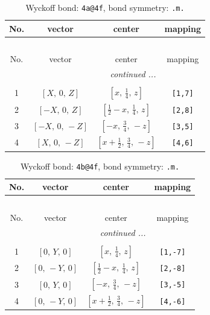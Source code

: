 \documentclass[fleqn,8pt]{jsarticle}
\begin{document}
\begin{longtable}{cccc}
\caption{Wyckoff bond: {\tt 4a@4f}, bond symmetry: {\tt .m.}}
 \\
 \hline \hline
No. & vector & center & mapping \\ \hline \endfirsthead

\multicolumn{3}{l}{\tablename\ \thetable{}} \\
 \hline \hline
No. & vector & center & mapping \\ \hline \endhead

 \hline \hline
\multicolumn{3}{r}{\footnotesize\it continued ...} \\ \endfoot

 \hline \hline
\multicolumn{3}{r}{} \\ \endlastfoot

1 & $\left[ X,\, 0,\, Z \right]$ & $\left[ x,\, \frac{1}{4},\, z \right]$ & {\tt [1,7]} \\ \hline
2 & $\left[ - X,\, 0,\, Z \right]$ & $\left[ \frac{1}{2} - x,\, \frac{1}{4},\, z \right]$ & {\tt [2,8]} \\ \hline
3 & $\left[ - X,\, 0,\, - Z \right]$ & $\left[ - x,\, \frac{3}{4},\, - z \right]$ & {\tt [3,5]} \\ \hline
4 & $\left[ X,\, 0,\, - Z \right]$ & $\left[ x + \frac{1}{2},\, \frac{3}{4},\, - z \right]$ & {\tt [4,6]} \\
\end{longtable}
\renewcommand{\arraystretch}{1.2}
\begin{longtable}{cccc}
\caption{Wyckoff bond: {\tt 4b@4f}, bond symmetry: {\tt .m.}}
 \\
 \hline \hline
No. & vector & center & mapping \\ \hline \endfirsthead

\multicolumn{3}{l}{\tablename\ \thetable{}} \\
 \hline \hline
No. & vector & center & mapping \\ \hline \endhead

 \hline \hline
\multicolumn{3}{r}{\footnotesize\it continued ...} \\ \endfoot

 \hline \hline
\multicolumn{3}{r}{} \\ \endlastfoot

1 & $\left[ 0,\, Y,\, 0 \right]$ & $\left[ x,\, \frac{1}{4},\, z \right]$ & {\tt [1,-7]} \\ \hline
2 & $\left[ 0,\, - Y,\, 0 \right]$ & $\left[ \frac{1}{2} - x,\, \frac{1}{4},\, z \right]$ & {\tt [2,-8]} \\ \hline
3 & $\left[ 0,\, Y,\, 0 \right]$ & $\left[ - x,\, \frac{3}{4},\, - z \right]$ & {\tt [3,-5]} \\ \hline
4 & $\left[ 0,\, - Y,\, 0 \right]$ & $\left[ x + \frac{1}{2},\, \frac{3}{4},\, - z \right]$ & {\tt [4,-6]} \\
\end{longtable}
\end{document}
